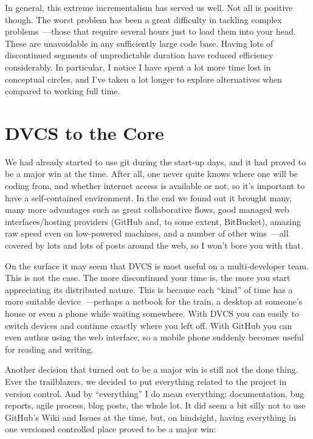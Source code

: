 \documentclass{book}
\begin{document}
In general, this extreme incrementalism has served us well. Not all is
positive though. The worst problem has been a great difficulty in
tackling complex problems~---those that require several hours just to
load them into your head. These are unavoidable in any sufficiently
large code base. Having lots of discontinued segments of unpredictable
duration have reduced efficiency considerably. In particular, I notice
I have spent a lot more time lost in conceptual circles, and I've
taken a lot longer to explore alternatives when compared to working
full time.

\section{DVCS to the Core}

We had already started to use git during the start-up days, and it had
proved to be a major win at the time. After all, one never quite knows
where one will be coding from, and whether internet access is
available or not, so it's important to have a self-contained
environment. In the end we found out it brought many, many more
advantages such as great collaborative flows, good managed web
interfaces/hosting providers (GitHub and, to some extent, BitBucket),
amazing raw speed even on low-powered machines, and a number of other
wins~---all covered by lots and lots of posts around the web, so I
won't bore you with that.

On the surface it may seem that DVCS is most useful on a
multi-developer team. This is not the case. The more discontinued your
time is, the more you start appreciating its distributed nature. This
is because each ``kind'' of time has a more suitable device~---perhaps
a netbook for the train, a desktop at someone's house or even a phone
while waiting somewhere. With DVCS you can easily to switch devices
and continue exactly where you left off. With GitHub you can even
author using the web interface, so a mobile phone suddenly becomes
useful for reading and writing.

Another decision that turned out to be a major win is still not the
done thing. Ever the trailblazers, we decided to put everything
related to the project in version control. And by ``everything'' I do
mean everything: documentation, bug reports, agile process, blog
posts, the whole lot. It did seem a bit silly not to use GitHub's Wiki
and Issues at the time, but, on hindsight, having everything in one
versioned controlled place proved to be a major win:
\end{document}
